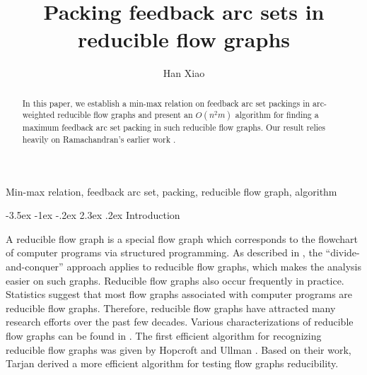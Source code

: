 \documentclass[11pt]{article}
\title{\bf Packing feedback arc sets in reducible flow graphs}
\author[1]{Han Xiao}
\affil[1]{Department of Mathematics, The University of Hong Kong,

Hong Kong, China

{\tt hxiao.math@connect.hku.hk}}
\makeatletter
\renewcommand\section{%
  \@startsection{section}{1}
                {\z@}%
                {-3.5ex \@plus -1ex \@minus -.2ex}%
                {2.3ex \@plus.2ex}%
                {\large\bfseries}%
}
\makeatother
\begin{document}
 \date{}
\maketitle

\begin{abstract}
In this paper, we establish a min-max relation on feedback arc set packings in arc-weighted reducible flow graphs and present an $O(n^2 m)$ algorithm for finding a maximum feedback arc set packing in such reducible flow graphs. Our result relies heavily on Ramachandran's earlier work \cite{Rama1,Rama2}.
\end{abstract}

\quad Min-max relation, feedback arc set, packing, reducible flow graph, algorithm


\jot


\section{Introduction}
\label{intro}

A reducible flow graph is a special flow graph which corresponds to the flowchart of computer programs via structured programming. As described in \cite{Hech}, the ``divide-and-conquer'' approach applies to reducible flow graphs, which makes the analysis easier on such graphs. Reducible flow graphs also occur frequently in practice. Statistics suggest that most flow graphs associated with computer programs are reducible flow graphs. Therefore, reducible flow graphs have attracted many research efforts over the past few decades. Various characterizations of reducible flow graphs can be found in \cite{HecU1}. The first efficient algorithm for recognizing reducible flow graphs was given by Hopcroft and Ullman \cite{HopU}. Based on their work, Tarjan \cite{Tarj} derived a more efficient algorithm for testing flow graphs reducibility. 
\end{document}
